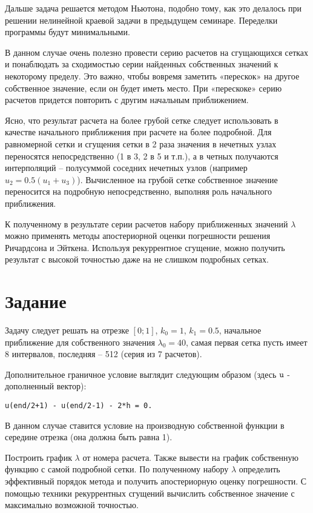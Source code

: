 Дальше задача решается методом Ньютона, подобно тому, как это делалось при решении нелинейной краевой задачи в предыдущем семинаре. Переделки программы будут минимальными.

В данном случае очень полезно провести серию расчетов на сгущающихся сетках и понаблюдать за сходимостью серии найденных собственных значений к некоторому пределу. Это важно, чтобы вовремя заметить «перескок» на другое собственное значение, если он будет иметь место. При «перескоке» серию расчетов придется повторить с другим начальным приближением.

Ясно, что результат расчета на более грубой сетке следует использовать в качестве начального приближения при расчете на более подробной. Для равномерной сетки и сгущения сетки в 2 раза значения в нечетных узлах переносятся непосредственно (1 в 3, 2 в 5 и т.п.), а в четных получаются интерполяций – полусуммой соседних нечетных узлов (например $u_2 = 0.5(u_1+u_3)$). Вычисленное на грубой сетке собственное значение переносится на подробную непосредственно, выполняя роль начального приближения.

К полученному в результате серии расчетов набору приближенных значений $\lambda$ можно применять методы апостериорной оценки погрешности решения Ричардсона и Эйткена. Используя рекуррентное сгущение, можно получить результат с высокой точностью даже на не слишком подробных сетках. 

\section{Задание}
Задачу следует решать на отрезке $[0; 1]$, $k_0 = 1$, $k_1 = 0.5$, начальное приближение для собственного значения $\lambda_0 = 40$, самая первая сетка пусть имеет 8 интервалов, последняя – 512  (серия из 7 расчетов). 

Дополнительное граничное условие выглядит следующим образом (здесь $\texttt{\lstinline|u|}$ - дополненный вектор):
\begin{matlablisting}
	\begin{verbatim}
u(end/2+1) - u(end/2-1) - 2*h = 0.
	\end{verbatim}
\end{matlablisting}
В данном случае ставится условие на производную собственной функции в середине отрезка (она должна быть равна 1).

Построить график $\lambda$ от номера расчета. Также вывести на график собственную функцию с самой подробной сетки. По полученному набору $\lambda$ определить эффективный порядок метода и получить апостериорную оценку погрешности. С помощью техники рекуррентных сгущений вычислить собственное значение с максимально возможной точностью.